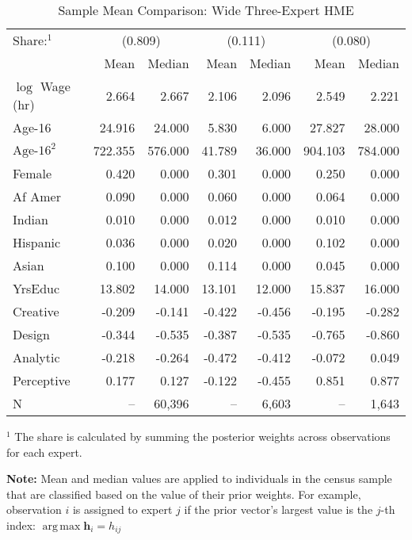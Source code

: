 \documentclass[12pt]{article}
\DeclareMathOperator*{\argmax}{arg\,max}
\theoremstyle{definition}
\begin{document}
  
  \begin{table} \centering
    \caption{Sample Mean Comparison: Wide Three-Expert HME}
    \begin{threeparttable}
      \begin{tabular}[l]{l r r r r r r}
    \cmidrule{1-7}
    Share:$^{1}$& \multicolumn{2}{c}{(0.809)} & \multicolumn{2}{c}{(0.111)} & \multicolumn{2}{c}{(0.080)} \\
                & Mean & Median & Mean & Median & Mean & Median \\
    \cmidrule{1-7}
    $\log$ Wage (hr)      &   2.664 &   2.667 &  2.106 &  2.096 &   2.549 &   2.221 \\
    Age-16                &  24.916 &  24.000 &  5.830 &  6.000 &  27.827 &  28.000 \\
    $\textrm{Age-16}^{2}$ & 722.355 & 576.000 & 41.789 & 36.000 & 904.103 & 784.000 \\
    Female                &   0.420 &   0.000 &  0.301 &  0.000 &   0.250 &   0.000 \\
    Af Amer               &   0.090 &   0.000 &  0.060 &  0.000 &   0.064 &   0.000 \\
    Indian                &   0.010 &   0.000 &  0.012 &  0.000 &   0.010 &   0.000 \\
    Hispanic              &   0.036 &   0.000 &  0.020 &  0.000 &   0.102 &   0.000 \\
    Asian                 &   0.100 &   0.000 &  0.114 &  0.000 &   0.045 &   0.000 \\
    YrsEduc               &  13.802 &  14.000 & 13.101 & 12.000 &  15.837 &  16.000 \\
    Creative              &  -0.209 &  -0.141 & -0.422 & -0.456 &  -0.195 &  -0.282 \\
    Design                &  -0.344 &  -0.535 & -0.387 & -0.535 &  -0.765 &  -0.860 \\
    Analytic              &  -0.218 &  -0.264 & -0.472 & -0.412 &  -0.072 &   0.049 \\
    Perceptive            &   0.177 &   0.127 & -0.122 & -0.455 &   0.851 &   0.877 \\
    \cmidrule{1-7}
    N                     &      -- &  60,396 &     -- &  6,603 &      -- &   1,643 \\
    \hline
      \end{tabular}
      \begin{tablenotes}
        \item{\footnotesize $^{1}$ The share is calculated by summing the 
        posterior weights across observations for each expert.}
        \item{\footnotesize \textbf{Note:} Mean and median values are applied to individuals
        in the census sample that are classified based on the value of their prior weights.
        For example, observation $i$ is assigned to expert $j$ if the prior vector's
        largest value is the $j$-th index: $\argmax \boldsymbol{h}_{i} = h_{ij}$}
      \end{tablenotes} \label{tbl:ME3_sample_comparison}
    \end{threeparttable}
  \end{table}
  
\end{document}
